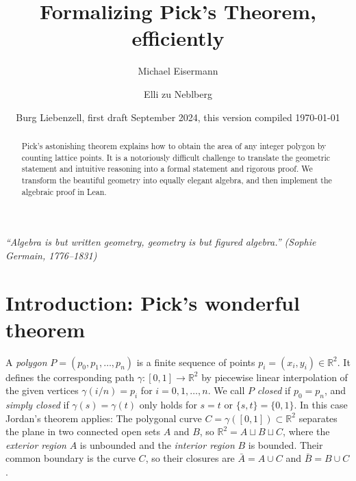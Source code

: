 \documentclass[a4paper]{amsart}
\title{Formalizing Pick's Theorem, efficiently} %
\author{Michael Eisermann}
\author{Elli zu Neblberg}
\date{Burg Liebenzell, first draft September 2024, this version compiled \today}
\numberwithin{equation}{section}
\theoremstyle{plain}
\theoremstyle{definition}
\newcommand{\R}{\mathbb{R}}
\begin{document}

\begin{abstract}
  Pick's astonishing theorem explains how to obtain %
  the area of any integer polygon by counting lattice points. %
  It is a notoriously difficult challenge %
  to translate the geometric statement and intuitive reasoning
  into a formal statement and rigorous proof. %
  We transform the beautiful geometry into equally elegant algebra,
  and then implement the algebraic proof in Lean.  
\end{abstract}

\maketitle

\begin{center}
  \small\it
  “Algebra is but written geometry, geometry is but figured algebra.”
  \rm (Sophie Germain, 1776--1831)
\end{center}

\section{Introduction: Pick's wonderful theorem} \label{sec:Introduction}

A \emph{polygon} $P = (p_0,p_1,\ldots,p_n)$ is %
a finite sequence of points $p_i = (x_i,y_i) \in \R^2$.
It defines the corresponding path $\gamma \colon [0,1] \to \R^2$
by piecewise linear interpolation of the given vertices
$\gamma(i/n) = p_i$ for $i=0,1,\dots,n$.
We call $P$ \emph{closed} if $p_0 = p_n$, and
\emph{simply closed} if $\gamma(s) = \gamma(t)$
only holds for $s = t$ or $\{s,t\} = \{0,1\}$.
In this case Jordan's theorem applies:
The polygonal curve $C = \gamma([0,1]) \subset \R^2$
separates the plane in two connected open sets $A$ and $B$,
so $\R^2 = A \sqcup B \sqcup C$, where the \emph{exterior region} $A$
is unbounded and the \emph{interior region} $B$ is bounded.
Their common boundary is the curve $C$, so their closures
are $\bar{A} = A \cup C$ and $\bar{B} = B \cup C$.
\end{document}
